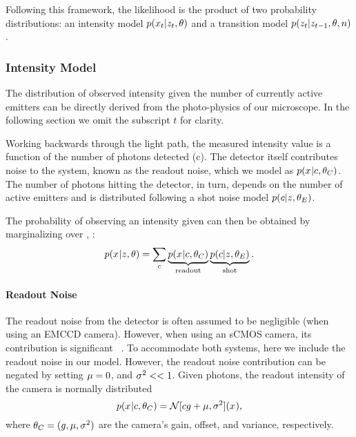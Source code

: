   Following this framework, the likelihood is the product of two probability
  distributions: an intensity model $p(x_{t}|z_{t},\theta)$ and a
  transition model $p(z_{t}|z_{t-1},\theta,n)$.

\subsubsection{Intensity Model}

The distribution of observed intensity  given the number of
currently active emitters  can be directly derived from the photo-physics
of our microscope.
  In the following section we omit the subscript $t$ for clarity.
  
Working backwards through the light path, the measured intensity value \x{}
is a function of the number of photons \photons detected
(c).
  The detector itself contributes noise to the system, known as the readout
  noise, which we model as $p(x_{}|c,\theta_C)$.
  The number of photons hitting the detector, in turn, depends on the number of
  active emitters \z{} and is distributed following a shot noise model
  $p(c|z_{},\theta_E)$.

The probability of observing an intensity \x{} given \z{} can then be obtained
by marginalizing over \photons, \ie:
  \begin{equation}
    p(x_{}|z_{},\theta) =
      \sum_c
        \underbrace{p(x_{}|c,\theta_C)}_{\text{readout}}
        \underbrace{p(c|z_{},\theta_E)}_{\text{shot}}
    \text{.}
    \label{eq:method:marginalized_intensity}
  \end{equation}

\paragraph{Readout Noise}

The readout noise from the detector is often assumed to be negligible (\ie when
using an EMCCD camera).
  However, when using an sCMOS camera, its contribution is 
  significant ~\citep{huang_video-rate_2013}.
  To accommodate both systems, here we include the readout noise in our model.
  However, the readout noise contribution can be negated by setting $\mu=0$, 
  and $\sigma^2 << 1$.
  Given \photons photons, the readout intensity of the camera is normally
  distributed~\citep{huang_video-rate_2013}
  \begin{equation}
    p(x_{}|c,\theta_C) = \mathcal{N}[cg + \mu, \sigma^2](x_{})
    \text{,}
  \end{equation}
  where $\theta_C = (g, \mu, \sigma^2)$ are the camera's gain,
  offset, and variance, respectively.

